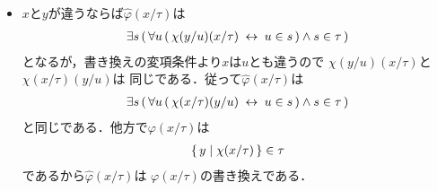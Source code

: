 \begin{metaprf}
\begin{description}
\begin{description}
\begin{itemize}
							\item $x$と$y$が違うならば$\widehat{\varphi}(x/\tau)$は
								\begin{align}
									\exists s\, (\, \forall u\, (\, \chi(y/u)(x/\tau) \hspace{0.25em}\leftrightarrow\hspace{0.25em} u \in s\, ) \wedge s \in \tau\, )
								\end{align}
								となるが，書き換えの変項条件より$x$は$u$とも違うので
								$\chi(y/u)(x/\tau)$と$\chi(x/\tau)(y/u)$は
								同じである．従って$\widehat{\varphi}(x/\tau)$は
								\begin{align}
									\exists s\, (\, \forall u\, (\, \chi(x/\tau)(y/u) \hspace{0.25em}\leftrightarrow\hspace{0.25em} u \in s\, ) \wedge s \in \tau\, )
								\end{align}
								と同じである．他方で$\varphi(x/\tau)$は
								\begin{align}
									\{\, y \mid \chi(x/\tau)\, \} \in \tau
								\end{align}
								であるから$\widehat{\varphi}(x/\tau)$は
								$\varphi(x/\tau)$の書き換えである．
						\end{itemize}
				\end{description}
		\end{description}
	\end{metaprf}